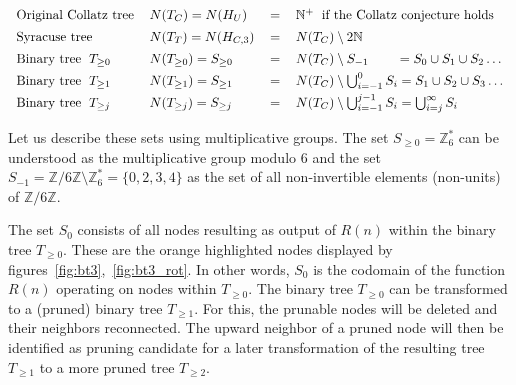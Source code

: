 \[\arraycolsep=0.6em\def\arraystretch{1.4}
\begin{array}{llll}
\text{Original Collatz tree} & N(T_C)=N(H_U)&=&\mathbb{N^+} \hspace{0.6em}\text{if the Collatz conjecture holds}\\
\text{Syracuse tree} & N(T_T)=N(H_{C,3})&=&N(T_C)\setminus2\mathbb{N}\\
\text{Binary tree}\hspace{0.6em}T_{\ge0}& N(T_{\ge0})=S_{\ge0}&=&N(T_C)\setminus S_{-1}\hspace{2.1em}=S_{0}\cup S_{1}\cup S_{2}\ldots\\
\text{Binary tree}\hspace{0.6em}T_{\ge1}& N(T_{\ge1})=S_{\ge1}&=&N(T_C)\setminus \bigcup_{i=-1}^{0}S_i=S_{1}\cup S_{2}\cup S_{3}\ldots\\
\text{Binary tree}\hspace{0.6em}T_{\ge j} & N(T_{\ge j})=S_{\ge j}&=&N(T_C)\setminus \bigcup_{i=-1}^{j-1}S_i=\bigcup_{i=j}^{\infty}S_i
\end{array}
\]

\par\medskip
Let us describe these sets using multiplicative groups. The set $S_{\ge0}=\mathbb{Z}^\ast_6$ can be understood as the multiplicative group modulo $6$ and the set $S_{-1}=\mathbb{Z}/6\mathbb{Z}\setminus\mathbb{Z}^\ast_6=\{0,2,3,4\}$ as the set of all non-invertible elements (non-units) of $\mathbb{Z}/6\mathbb{Z}$.

The set $S_0$ consists of all nodes resulting as output of $R(n)$ within the binary tree $T_{\ge0}$. These are the orange highlighted nodes displayed by figures~\ref{fig:bt3},~\ref{fig:bt3_rot}. In other words, $S_0$ is the codomain of the function $R(n)$ operating on nodes within $T_{\ge0}$. The binary tree $T_{\ge0}$ can be transformed to a (pruned) binary tree $T_{\ge1}$. For this, the prunable nodes will be deleted and their neighbors reconnected. The upward neighbor of a pruned node will then be identified as pruning candidate for a later transformation of the resulting tree $T_{\ge1}$ to a more pruned tree $T_{\ge2}$.

